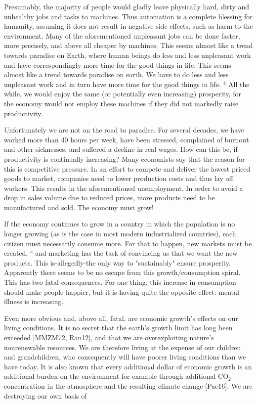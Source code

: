 \documentclass[10pt]{book}
\begin{document}
Presumably, the majority of people would gladly leave physically hard, dirty and unhealthy jobs and tasks to machines. Thus automation is a complete blessing for humanity, assuming it does not result in negative side effects, such as harm to the environment. Many of the aforementioned unpleasant jobs can be done faster, more precisely, and above all cheaper by machines. This seems almost like a trend towards paradise on Earth, where human beings do less and less unpleasant work and have correspondingly more time for the good things in life. This seems almost like a trend towards paradise on earth. We have to do less and less unpleasant work and in turn have more time for the good things in life. ${ }^{4}$ All the while, we would enjoy the same (or potentially even increasing) prosperity, for the economy would not employ these machines if they did not markedly raise productivity.

Unfortunately we are not on the road to paradise. For several decades, we have worked more than 40 hours per week, have been stressed, complained of burnout and other sicknesses, and suffered a decline in real wages. How can this be, if productivity is continually increasing? Many economists say that the reason for this is competitive pressure. In an effort to compete and deliver the lowest priced goods to market, companies need to lower production costs and thus lay off workers. This results in the aforementioned unemployment. In order to avoid a drop in sales volume due to reduced prices, more products need to be manufactured and sold. The economy must grow!

If the economy continues to grow in a country in which the population is no longer growing (as is the case in most modern industrialized countries), each citizen must necessarily consume more. For that to happen, new markets must be created, ${ }^{5}$ and marketing has the task of convincing us that we want the new products. This is-allegedly-the only way to "sustainably" ensure prosperity. Apparently there seems to be no escape from this growth/consumption spiral. This has two fatal consequences. For one thing, this increase in consumption should make people happier, but it is having quite the opposite effect: mental illness is increasing.

Even more obvious and, above all, fatal, are economic growth's effects on our living conditions. It is no secret that the earth's growth limit has long been exceeded [MMZM72, Ran12], and that we are overexploiting nature's nonrenewable resources. We are therefore living at the expense of our children and grandchildren, who consequently will have poorer living conditions than we have today. It is also known that every additional dollar of economic growth is an additional burden on the environment-for example through additional $\mathrm{CO}_{2}$ concentration in the atmosphere and the resulting climate change [Pae16]. We are destroying our own basis of
\end{document}
